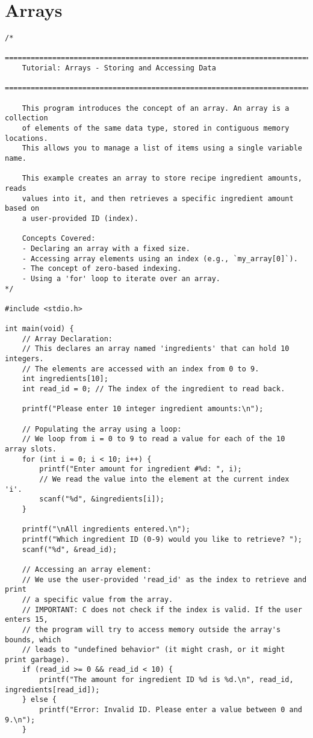 \documentclass[11pt]{book}
\begin{document}
\chapter{Arrays}
\clearpage
\begin{verbatim}
/*
    ================================================================================
    Tutorial: Arrays - Storing and Accessing Data
    ================================================================================

    This program introduces the concept of an array. An array is a collection
    of elements of the same data type, stored in contiguous memory locations.
    This allows you to manage a list of items using a single variable name.

    This example creates an array to store recipe ingredient amounts, reads
    values into it, and then retrieves a specific ingredient amount based on
    a user-provided ID (index).

    Concepts Covered:
    - Declaring an array with a fixed size.
    - Accessing array elements using an index (e.g., `my_array[0]`).
    - The concept of zero-based indexing.
    - Using a 'for' loop to iterate over an array.
*/

#include <stdio.h>

int main(void) {
    // Array Declaration:
    // This declares an array named 'ingredients' that can hold 10 integers.
    // The elements are accessed with an index from 0 to 9.
    int ingredients[10];
    int read_id = 0; // The index of the ingredient to read back.

    printf("Please enter 10 integer ingredient amounts:\n");

    // Populating the array using a loop:
    // We loop from i = 0 to 9 to read a value for each of the 10 array slots.
    for (int i = 0; i < 10; i++) {
        printf("Enter amount for ingredient #%d: ", i);
        // We read the value into the element at the current index 'i'.
        scanf("%d", &ingredients[i]);
    }

    printf("\nAll ingredients entered.\n");
    printf("Which ingredient ID (0-9) would you like to retrieve? ");
    scanf("%d", &read_id);

    // Accessing an array element:
    // We use the user-provided 'read_id' as the index to retrieve and print
    // a specific value from the array.
    // IMPORTANT: C does not check if the index is valid. If the user enters 15,
    // the program will try to access memory outside the array's bounds, which
    // leads to "undefined behavior" (it might crash, or it might print garbage).
    if (read_id >= 0 && read_id < 10) {
        printf("The amount for ingredient ID %d is %d.\n", read_id, ingredients[read_id]);
    } else {
        printf("Error: Invalid ID. Please enter a value between 0 and 9.\n");
    }


\end{verbatim}
\end{document}
